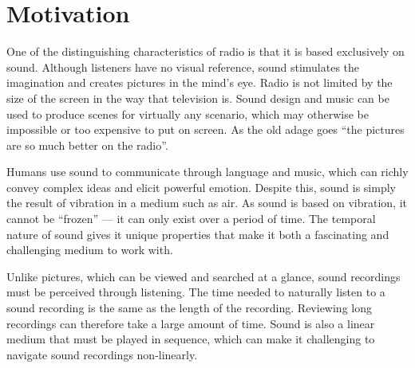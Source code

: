 
\section{Motivation}\label{sec:intro-motivation}



One of the distinguishing characteristics of radio is that it is based exclusively on sound.  Although listeners have
no visual reference, sound stimulates the imagination and creates pictures in the mind's eye.  Radio is not limited
by the size of the screen in the way that television is. Sound design and music can be used to produce scenes for
virtually any scenario, which may otherwise be impossible or too expensive to put on screen. As the old adage goes
``the pictures are so much better on the radio''.

Humans use sound to communicate through language and music, which can richly convey complex ideas and elicit powerful
emotion. Despite this, sound is simply the result of vibration in a medium such as air.  As sound is based on
vibration, it cannot be ``frozen'' --- it can only exist over a period of time. The temporal nature of sound gives it
unique properties that make it both a fascinating and challenging medium to work with.

Unlike pictures, which can be viewed and searched at a glance, sound recordings must be perceived through listening.
The time needed to naturally listen to a sound recording is the same as the length of the recording.  Reviewing long
recordings can therefore take a large amount of time. Sound is also a linear medium that must be played in sequence,
which can make it challenging to navigate sound recordings non-linearly. 

